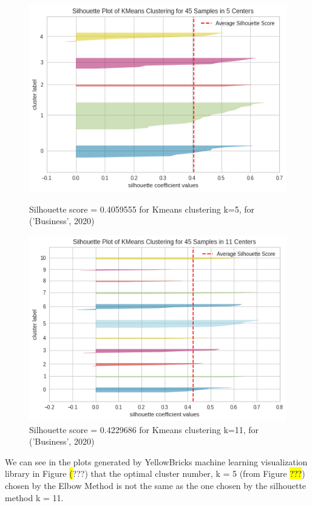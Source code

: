 \begin{figure}[H]
\begin{minipage}{0.5\linewidth}
\centering
\includegraphics[width=\linewidth]{images/cluster 5.png}
\caption{Silhouette score = 0.4059555 for Kmeans clustering k=5, for (’Business’, 2020)}
\end{minipage}
\hfill
\begin{minipage}{0.48\linewidth}
\centering
\includegraphics[width=\linewidth]{images/cluster 11.png}
\caption{Silhouette score = 0.4229686 for Kmeans clustering k=11, for (’Business’, 2020)}
\end{minipage}
\end{figure}

We can see in the plots generated by YellowBricks machine learning visualization library in Figure \hl(???) that the optimal cluster number, k = 5 (from Figure \hl{???}) chosen by the Elbow Method is not the same as the one chosen by the silhouette method k = 11.

